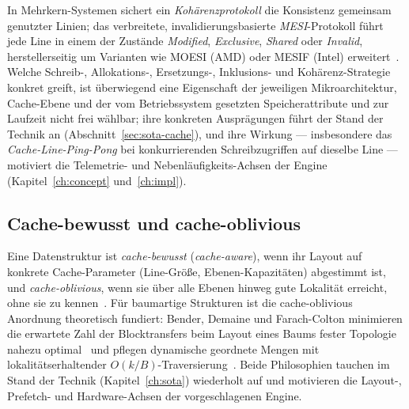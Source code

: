 In Mehrkern-Systemen sichert ein \emph{Kohärenzprotokoll} die Konsistenz gemeinsam genutzter Linien;
das verbreitete, invalidierungsbasierte \emph{MESI}-Protokoll führt jede Line in einem der Zustände
\emph{Modified}, \emph{Exclusive}, \emph{Shared} oder \emph{Invalid}, herstellerseitig um Varianten
wie MOESI (AMD) oder MESIF (Intel) erweitert~\cite{hennessy2019architecture}. Welche Schreib-,
Allokations-, Ersetzungs-, Inklusions- und Kohärenz-Strategie konkret greift, ist überwiegend eine
Eigenschaft der jeweiligen Mikroarchitektur, Cache-Ebene und der vom Betriebssystem gesetzten
Speicherattribute und zur Laufzeit nicht frei wählbar; ihre konkreten Ausprägungen führt der Stand
der Technik an (Abschnitt~\ref{sec:sota-cache}), und ihre Wirkung --- insbesondere das
\emph{Cache-Line-Ping-Pong} bei konkurrierenden Schreibzugriffen auf dieselbe Line --- motiviert die
Telemetrie- und Nebenläufigkeits-Achsen der Engine (Kapitel~\ref{ch:concept} und~\ref{ch:impl}).

\subsection{Cache-bewusst und cache-oblivious}\label{ssec:aware-oblivious}
Eine Datenstruktur ist \emph{cache-bewusst} (\emph{cache-aware}), wenn ihr Layout auf konkrete
Cache-Parameter (Line-Größe, Ebenen-Kapazitäten) abgestimmt ist, und \emph{cache-oblivious}, wenn
sie über alle Ebenen hinweg gute Lokalität erreicht, ohne sie zu kennen~\cite{frigo1999cache}. Für
baumartige Strukturen ist die cache-oblivious Anordnung theoretisch fundiert: Bender, Demaine und
Farach-Colton minimieren die erwartete Zahl der Blocktransfers beim Layout eines Baums fester
Topologie nahezu optimal~\cite{bender2002treelayout} und pflegen dynamische geordnete Mengen mit
lokalitätserhaltender $O(k/B)$-Traversierung~\cite{bender2002scanning}. Beide Philosophien tauchen
im Stand der Technik (Kapitel~\ref{ch:sota}) wiederholt auf und motivieren die Layout-, Prefetch-
und Hardware-Achsen der vorgeschlagenen Engine.

